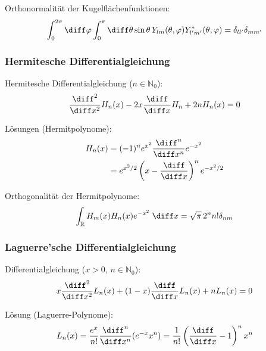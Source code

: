 \documentclass[11pt]{article}
\numberwithin{equation}{section}
\begin{document}
        Orthonormalität der Kugelflächenfunktionen:
        \begin{equation}
          \int_0^{2\pi}\diff\varphi \int_0^{\pi}\diff\theta \sin\theta\,  Y_{lm}(\theta,\varphi) Y^{*}_{l'm'}(\theta,\varphi) = \delta_{ll'}\delta_{mm'}
        \end{equation}

      \subsubsection{Hermitesche Differentialgleichung}
        Hermitesche Differentialgleichung ($n\in\mathbb{N}_0$):
        \begin{equation}
          \frac{\diff^2}{\diff x^2} H_n(x) -2x\tder{}{x} H_n+2 n H_n(x)=0
        \end{equation}

        Lösungen (Hermitpolynome):
        \begin{equation} \label{eq:Hermitpolynome}
          \begin{aligned}
            H_n(x) &= (-1)^n e^{x^2} \frac{\diff^n}{\diff x^n}e^{-x^2} \\
            &= e^{x^2/2}\left(x-\tder{}{x}\right)^n e^{-x^2/2} \\
          \end{aligned}
        \end{equation}

        Orthogonalität der Hermitpolynome:
        \begin{equation}
          \int_{\mathbb{R}} H_m(x) H_n(x) e^{-x^2}\;\diff x = \sqrt{\pi}\,2^n n!\delta_{nm}
        \end{equation}

      \subsubsection{Laguerre'sche Differentialgleichung}
        Differentialgleichung ($x>0$, $n\in\mathbb{N}_0$):
        \begin{equation}
          x\frac{\diff^2}{\diff x^2}L_n(x) +(1-x)\tder{}{x}L_n(x) + nL_n(x) = 0
        \end{equation}

        Lösung (Laguerre-Polynome):
        \begin{equation}
          L_n(x) = \frac{e^x}{n!}\frac{\diff^n}{\diff x^n}(e^{-x} x^n) = \frac{1}{n!} \left(\tder{}{x}-1\right)^n x^n
        \end{equation}
\end{document}
